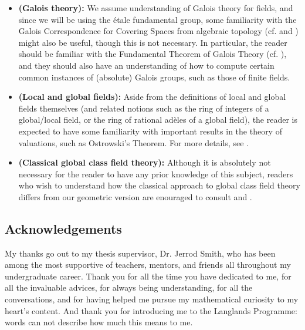         \begin{convention} \label{conv: number_theory}
            \noindent
            \begin{itemize}
                \item \textbf{(Galois theory):} We assume understanding of Galois theory for fields, and since we will be using the \'etale fundamental group, some familiarity with the Galois Correspondence for Covering Spaces from algebraic topology (cf. \cite{MATH525_covering_spaces_and_fundamental_group_project} and \cite[Theorem 1.38 and Proposition 1.39]{hatcher2002algebraic}) might also be useful, though this is not necessary. In particular, the reader should be familiar with the Fundamental Theorem of Galois Theory (cf. \cite[\href{https://stacks.math.columbia.edu/tag/0BML}{Tag 0BML}]{stacks}), and they should also have an understanding of how to compute certain common instances of (absolute) Galois groups, such as those of finite fields.
                \item \textbf{(Local and global fields):} Aside from the definitions of local and global fields themselves (and related notions such as the ring of integers of a global/local field, or the ring of rational ad\`eles of a global field), the reader is expected to have some familiarity with important results in the theory of valuations, such as Ostrowski's Theorem. For more details, see \cite[Chapter II]{neukirch_2010_algebraic_number_theory}.
                \item \textbf{(Classical global class field theory):} Although it is absolutely not necessary for the reader to have any prior knowledge of this subject, readers who wish to understand how the classical approach to global class field theory differs from our geometric version are enouraged to consult \cite[Chapters IV and VI]{neukirch_2010_algebraic_number_theory} and \cite[Chapters III, VIII, and IX]{neukirch_1999_cohomology_of_number_field}.
            \end{itemize}
        \end{convention}
        
    \subsection{Acknowledgements}
        My thanks go out to my thesis supervisor, Dr. Jerrod Smith, who has been among the most supportive of teachers, mentors, and friends all throughout my undergraduate career. Thank you for all the time you have dedicated to me, for all the invaluable advices, for always being understanding, for all the conversations, and for having helped me pursue my mathematical curiosity to my heart's content. And thank you for introducing me to the Langlands Programme: words can not describe how much this means to me.
        
